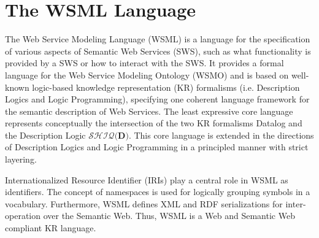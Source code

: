 \section{The WSML Language}\label{sec:wsml}

%
The Web Service Modeling Language (WSML) is a language for the
specification of various aspects of Semantic Web Services (SWS),
such as what functionality is provided by a SWS or how to interact
with the SWS. It provides a formal language for the Web Service
Modeling Ontology (WSMO) and is based on well-known logic-based
knowledge representation (KR) formalisms (i.e. Description Logics
and Logic Programming), specifying one coherent language framework
for the semantic description of Web Services. The least expressive
core language represents conceptually the intersection of the two
KR formalisms Datalog and the Description Logic $\mathcal{SHIQ}(\mathbf{D)}$.
This core language is extended in the directions of Description
Logics and Logic Programming in a principled manner with strict
layering.

Internationalized Resource Identifier (IRIs) play a central role
in WSML as identifiers. The concept of namespaces is used for
logically grouping symbols in a vocabulary. Furthermore, WSML
defines XML and RDF serializations for inter-operation over the
Semantic Web. Thus, WSML is a Web and Semantic Web compliant KR
language.

